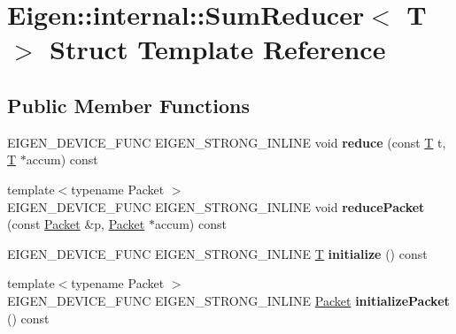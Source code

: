 \hypertarget{struct_eigen_1_1internal_1_1_sum_reducer}{}\section{Eigen\+:\+:internal\+:\+:Sum\+Reducer$<$ T $>$ Struct Template Reference}
\label{struct_eigen_1_1internal_1_1_sum_reducer}
\subsection*{Public Member Functions}
\begin{DoxyCompactItemize}
\item 
\mbox{\label{struct_eigen_1_1internal_1_1_sum_reducer_a70cab9917c7d28a521d639535be41fb4}} 
E\+I\+G\+E\+N\+\_\+\+D\+E\+V\+I\+C\+E\+\_\+\+F\+U\+NC E\+I\+G\+E\+N\+\_\+\+S\+T\+R\+O\+N\+G\+\_\+\+I\+N\+L\+I\+NE void {\bfseries reduce} (const \hyperlink{group___sparse_core___module}{T} t, \hyperlink{group___sparse_core___module}{T} $\ast$accum) const
\item 
\mbox{\label{struct_eigen_1_1internal_1_1_sum_reducer_a6d29d6c7e2c0f46f7a5b7f573b8e9f42}} 
{\footnotesize template$<$typename Packet $>$ }\\E\+I\+G\+E\+N\+\_\+\+D\+E\+V\+I\+C\+E\+\_\+\+F\+U\+NC E\+I\+G\+E\+N\+\_\+\+S\+T\+R\+O\+N\+G\+\_\+\+I\+N\+L\+I\+NE void {\bfseries reduce\+Packet} (const \hyperlink{union_eigen_1_1internal_1_1_packet}{Packet} \&p, \hyperlink{union_eigen_1_1internal_1_1_packet}{Packet} $\ast$accum) const
\item 
\mbox{\label{struct_eigen_1_1internal_1_1_sum_reducer_af56eb063e0036254dfe696d4d1f3ea9e}} 
E\+I\+G\+E\+N\+\_\+\+D\+E\+V\+I\+C\+E\+\_\+\+F\+U\+NC E\+I\+G\+E\+N\+\_\+\+S\+T\+R\+O\+N\+G\+\_\+\+I\+N\+L\+I\+NE \hyperlink{group___sparse_core___module}{T} {\bfseries initialize} () const
\item 
\mbox{\label{struct_eigen_1_1internal_1_1_sum_reducer_ab2a98c39e56e2d2052c8405fbe22dfc1}} 
{\footnotesize template$<$typename Packet $>$ }\\E\+I\+G\+E\+N\+\_\+\+D\+E\+V\+I\+C\+E\+\_\+\+F\+U\+NC E\+I\+G\+E\+N\+\_\+\+S\+T\+R\+O\+N\+G\+\_\+\+I\+N\+L\+I\+NE \hyperlink{union_eigen_1_1internal_1_1_packet}{Packet} {\bfseries initialize\+Packet} () const

\end{DoxyCompactItemize}
